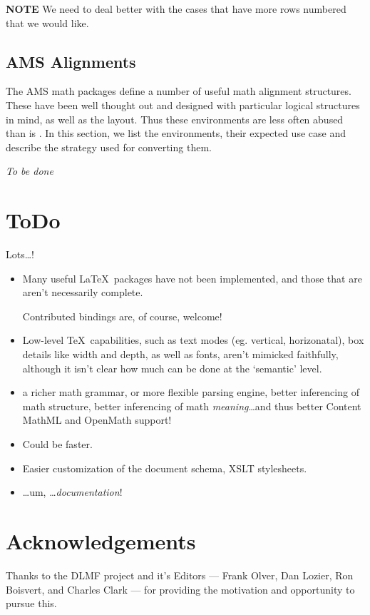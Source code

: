 \documentclass{book}
\begin{document}
\textbf{NOTE} We need to deal better with the cases that have more
rows numbered that we would like.

\section{AMS Alignments}\label{amsalign}
The AMS math packages define a number of useful math alignment structures.
These have been well thought out and designed with particular logical
structures in mind, as well as the layout. Thus these environments are
less often abused than is .  In this section, we list
the environments, their expected use case and describe the strategy used
for converting them.

\emph{To be done}

\chapter{ToDo}\label{todo}
Lots\ldots!
\begin{itemize}
\item Many useful \LaTeX\ packages have not been implemented, and those
  that are aren't necessarily complete.

  Contributed bindings are, of course, welcome!
\item Low-level \TeX\ capabilities, such as text modes (eg. vertical, horizonatal),
 box details like width and depth, as well as fonts,  aren't mimicked faithfully,
  although it isn't clear how much can be done at the `semantic' level.
\item a richer math grammar, or more flexible parsing engine,
  better inferencing of math structure,
  better inferencing of math \emph{meaning}\ldots and thus better
  Content MathML and OpenMath support!
\item Could be faster.
\item Easier customization of the document schema, XSLT stylesheets.
\item \ldots um, \ldots \emph{documentation}!
\end{itemize}

\chapter*{Acknowledgements}\label{acknowledgements}
Thanks to the DLMF project and it's Editors ---
Frank Olver, Dan Lozier, Ron Boisvert, and Charles Clark ---
for providing the motivation and opportunity to pursue this.
\end{document}
